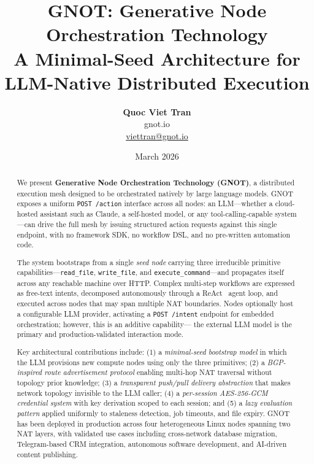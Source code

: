 \documentclass[10pt,twocolumn]{article}
\begin{document}
\title{%
  \textbf{GNOT: Generative Node Orchestration Technology}\\[4pt]
  \large A Minimal-Seed Architecture for LLM-Native Distributed Execution
}

\author{%
  \textbf{Quoc Viet Tran} \\
  \small gnot.io \\
  \small \href{mailto:viettran@gnot.io}{viettran@gnot.io}
}

\date{March 2026}

\maketitle
\thispagestyle{fancy}

\begin{abstract}
We present \textbf{Generative Node Orchestration Technology (GNOT)}, a
distributed execution mesh designed to be orchestrated natively by large
language models. GNOT exposes a uniform \texttt{POST /action} interface
across all nodes: an LLM---whether a cloud-hosted assistant such as
Claude, a self-hosted model, or any tool-calling-capable system---can
drive the full mesh by issuing structured action requests against this
single endpoint, with no framework SDK, no workflow DSL, and no
pre-written automation code.

The system bootstraps from a single \emph{seed node} carrying three
irreducible primitive capabilities---\texttt{read\_file},
\texttt{write\_file}, and \texttt{execute\_command}---and propagates
itself across any reachable machine over HTTP. Complex multi-step
workflows are expressed as free-text intents, decomposed autonomously
through a ReAct~\cite{react2022} agent loop, and executed across nodes
that may span multiple NAT boundaries. Nodes optionally host a
configurable LLM provider, activating a \texttt{POST /intent} endpoint
for embedded orchestration; however, this is an additive capability---
the external LLM model is the primary and production-validated
interaction mode.

Key architectural contributions include: (1) a \emph{minimal-seed
bootstrap model} in which the LLM provisions new compute nodes using
only the three primitives; (2) a \emph{BGP-inspired route advertisement
protocol} enabling multi-hop NAT traversal without topology prior
knowledge; (3) a \emph{transparent push/pull delivery abstraction}
that makes network topology invisible to the LLM caller; (4) a
\emph{per-session AES-256-GCM credential system} with key derivation
scoped to each session; and (5) a \emph{lazy evaluation pattern}
applied uniformly to staleness detection, job timeouts, and file expiry.
GNOT has been deployed in production across four heterogeneous Linux
nodes spanning two NAT layers, with validated use cases including
cross-network database migration, Telegram-based CRM integration,
autonomous software development, and AI-driven content publishing.
\end{abstract}
\end{document}
